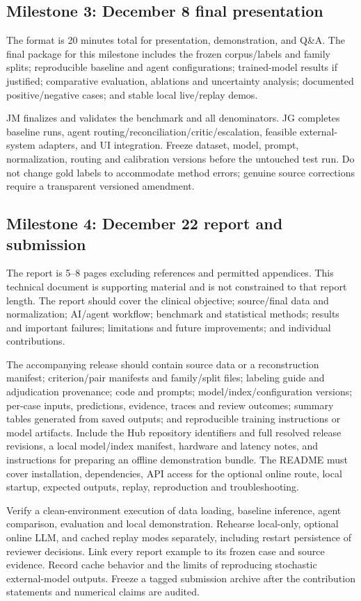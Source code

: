 \documentclass[10pt,letterpaper]{article}
\begin{document}
\subsection{Milestone 3: December 8 final presentation}
The format is 20 minutes total for presentation, demonstration, and Q\&A.
The final package for this milestone includes the frozen corpus/labels and
family splits; reproducible baseline and agent configurations; trained-model
results if justified; comparative evaluation, ablations and uncertainty
analysis; documented positive/negative cases; and stable local live/replay demos.

JM finalizes and validates the benchmark and all denominators. JG completes
baseline runs, agent routing/reconciliation/critic/escalation, feasible
external-system adapters, and UI integration. Freeze dataset, model, prompt,
normalization, routing and calibration versions before the untouched test
run. Do not change gold labels to accommodate method errors; genuine source
corrections require a transparent versioned amendment.

\subsection{Milestone 4: December 22 report and submission}
The report is 5--8 pages excluding references and permitted appendices. This
technical document is supporting material and is not constrained to that
report length. The report should cover the clinical objective; source/final
data and normalization; AI/agent workflow; benchmark and statistical methods;
results and important failures; limitations and future improvements; and
individual contributions.

The accompanying release should contain source data or a reconstruction
manifest; criterion/pair manifests and family/split files; labeling guide and
adjudication provenance; code and prompts; model/index/configuration versions;
per-case inputs, predictions, evidence, traces and review outcomes; summary
tables generated from saved outputs; and reproducible training instructions
or model artifacts. Include the Hub repository identifiers and full resolved
release revisions, a local model/index manifest, hardware and latency notes,
and instructions for preparing an offline demonstration bundle. The README
must cover installation, dependencies, API access for the optional online
route, local startup, expected outputs, replay, reproduction and troubleshooting.

Verify a clean-environment execution of data loading, baseline inference,
agent comparison, evaluation and local demonstration. Rehearse local-only,
optional online LLM, and cached replay modes separately, including restart
persistence of reviewer decisions. Link every report example to
its frozen case and source evidence. Record cache behavior and the limits of
reproducing stochastic external-model outputs. Freeze a tagged submission
archive after the contribution statements and numerical claims are audited.
\end{document}
